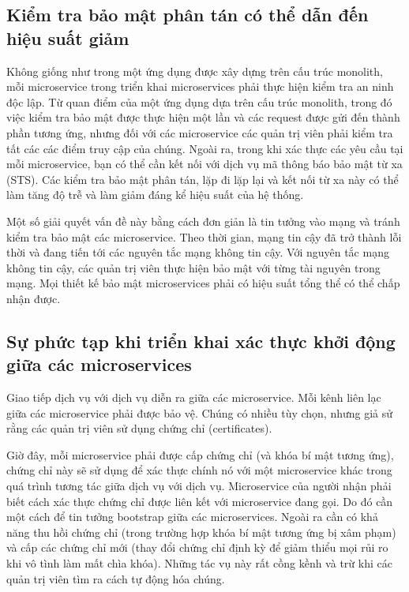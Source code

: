 \documentclass[12pt,a4paper]{report}
\begin{document}
		\subsection{Kiểm tra bảo mật phân tán có thể dẫn đến hiệu suất giảm}
				{\hspace{0.6cm}Không giống như trong một ứng dụng được xây dựng trên cấu trúc monolith, mỗi microservice trong triển khai microservices phải thực hiện kiểm tra an ninh độc lập. Từ quan điểm của một ứng dụng dựa trên cấu trúc monolith, trong đó việc kiểm tra bảo mật được thực hiện một lần và các request được gửi đến thành phần tương ứng, nhưng đối với các microservice các quản trị viên phải kiểm tra tất các các điểm truy cập của chúng. Ngoài ra, trong khi xác thực các yêu cầu tại mỗi microservice, bạn có thể cần kết nối với dịch vụ mã thông báo bảo mật từ xa (STS). Các kiểm tra bảo mật phân tán, lặp đi lặp lại và kết nối từ xa này có thể làm tăng độ trễ và làm giảm đáng kể hiệu suất của hệ thống.\\}
				
				Một số giải quyết vấn đề này bằng cách đơn giản là tin tưởng vào mạng và tránh kiểm tra bảo mật các microservice. Theo thời gian, mạng tin cậy đã trở thành lỗi thời và đang tiến tới các nguyên tắc mạng không tin cậy. Với nguyên tắc mạng không tin cậy, các quản trị viên thực hiện bảo mật với từng tài nguyên trong mạng. Mọi thiết kế bảo mật microservices phải có hiệu suất tổng thể có thể chấp nhận được.
		\subsection{Sự phức tạp khi triển khai xác thực khởi động giữa các	microservices}
				{\hspace{0.6cm}Giao tiếp dịch vụ với dịch vụ diễn ra giữa các microservice. Mỗi kênh liên lạc giữa các microservice phải được bảo vệ. Chúng có nhiều tùy chọn, nhưng giả sử rằng các quản trị viên sử dụng chứng chỉ (certificates).\\}
				
				Giờ đây, mỗi microservice phải được cấp chứng chỉ (và khóa bí mật tương ứng), chứng chỉ này sẽ sử dụng để xác thực chính nó với một microservice khác trong quá trình tương tác giữa dịch vụ với dịch vụ. Microservice của người nhận phải biết cách xác thực chứng chỉ được liên kết với microservice đang gọi. Do đó cần một cách để tin tưởng bootstrap giữa các microservices. Ngoài ra cần có khả năng thu hồi chứng chỉ (trong trường hợp khóa bí mật tương ứng bị xâm phạm) và cấp các chứng chỉ mới (thay đổi chứng chỉ định kỳ để giảm thiểu mọi rủi ro khi vô tình làm mất chìa khóa). Những tác vụ này rất cồng kềnh và trừ khi các quản trị viên tìm ra cách tự động hóa chúng.\\
\end{document}

